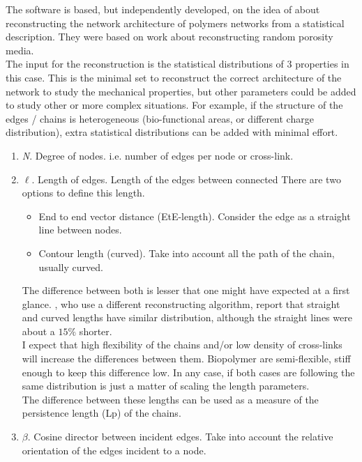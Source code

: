 The  software is based, but independently developed,  on the idea of
\citet{lindstrom_biopolymer_2010} about reconstructing the network
architecture of polymers networks from a statistical description. They were
based on \citet{yeong_reconstructing_1998,yeong_reconstructing_1998-1} work
about  reconstructing random porosity media.\\
The input for the reconstruction is the
statistical distributions of $3$ properties in this case. This is the minimal 
set to reconstruct the correct architecture of the network to study the
mechanical properties, but other parameters could be added to study other or
more complex situations.  For example, if the structure of the edges / chains is
heterogeneous  (bio-functional areas, or different charge distribution), extra
statistical distributions can be added with minimal effort.
\begin{enumerate} 
\item \emph{N}. Degree of nodes. i.e. number of edges per node or cross-link. 
\item \emph{$\ell$}. Length of edges. Length of the edges between connected
There are two options to define this length.
\begin{itemize}
\item End to end vector distance (EtE-length). Consider the edge as a straight
line between nodes.

\item Contour length (curved). Take into account all the path of the chain,
usually curved.
\end{itemize}

The difference between both is lesser that one
might have expected at a first glance. \citet{nisslert_identification_2007},
who use a different reconstructing algorithm, report that straight and curved
lengths have similar distribution, although the straight lines were about a
$15\%$ shorter.\\
I expect that high flexibility of the chains and/or low density of cross-links
will increase the differences between them. Biopolymer are semi-flexible, stiff
enough to keep this difference low.
In any case, if both cases are following the same distribution is just a matter
of scaling the length parameters.\\
The difference between these lengths can be used as a measure of the
persistence length (\gls{Lp}) of the chains.
  

\item \emph{$\beta$}. Cosine director between incident edges. Take into account
the relative orientation of the edges incident to a node.


\end{enumerate}

